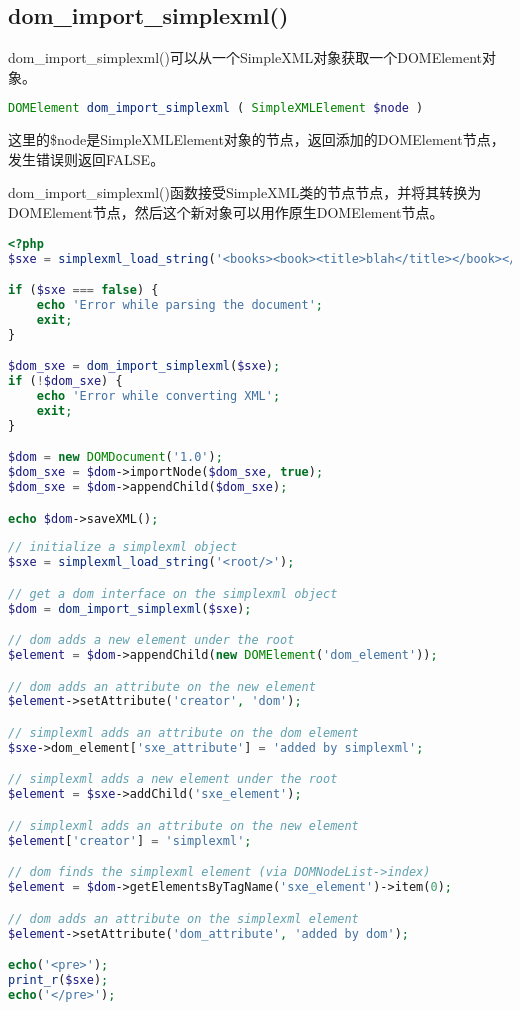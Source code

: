 \subsection{dom\_import\_simplexml()}


dom\_import\_simplexml()可以从一个SimpleXML对象获取一个DOMElement对象。




\begin{lstlisting}[language=PHP]
DOMElement dom_import_simplexml ( SimpleXMLElement $node )
\end{lstlisting}

这里的\$node是SimpleXMLElement对象的节点，返回添加的DOMElement节点，发生错误则返回FALSE。

dom\_import\_simplexml()函数接受SimpleXML类的节点节点，并将其转换为DOMElement节点，然后这个新对象可以用作原生DOMElement节点。


\begin{lstlisting}[language=PHP]
<?php
$sxe = simplexml_load_string('<books><book><title>blah</title></book></books>');

if ($sxe === false) {
    echo 'Error while parsing the document';
    exit;
}

$dom_sxe = dom_import_simplexml($sxe);
if (!$dom_sxe) {
    echo 'Error while converting XML';
    exit;
}

$dom = new DOMDocument('1.0');
$dom_sxe = $dom->importNode($dom_sxe, true);
$dom_sxe = $dom->appendChild($dom_sxe);

echo $dom->saveXML();
\end{lstlisting}


\begin{lstlisting}[language=PHP]
// initialize a simplexml object
$sxe = simplexml_load_string('<root/>');

// get a dom interface on the simplexml object
$dom = dom_import_simplexml($sxe);

// dom adds a new element under the root
$element = $dom->appendChild(new DOMElement('dom_element'));

// dom adds an attribute on the new element
$element->setAttribute('creator', 'dom');

// simplexml adds an attribute on the dom element
$sxe->dom_element['sxe_attribute'] = 'added by simplexml';

// simplexml adds a new element under the root
$element = $sxe->addChild('sxe_element');

// simplexml adds an attribute on the new element
$element['creator'] = 'simplexml';

// dom finds the simplexml element (via DOMNodeList->index)
$element = $dom->getElementsByTagName('sxe_element')->item(0);

// dom adds an attribute on the simplexml element
$element->setAttribute('dom_attribute', 'added by dom');

echo('<pre>');
print_r($sxe);
echo('</pre>');
\end{lstlisting}




